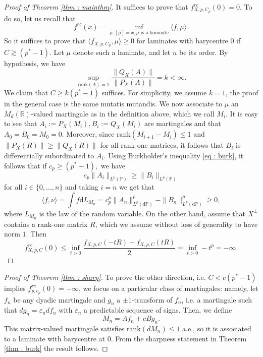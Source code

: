 \documentclass[11pt, a4paper, reqno]{elsarticle}
\theoremstyle{definition}
\theoremstyle{remark}
\begin{document}
\begin{proof}[Proof of Theorem \ref{thm : mainthm}]
It suffices to prove that $f_{X,p,C_p}^{rc}(0)=0$.
To do so, let us recall that
\begin{equation*}
	f^{rc}(x)
=
	\inf_{\mu\colon  [\mu]=x, \mu\text{ is a laminate}}
	\langle f,\mu\rangle.
\end{equation*}
So it suffices to prove that $\langle f_{X,p,C_p},\mu\rangle\ge 0$
for laminates with barycentre $0$ if $C\gtrsim (p^*-1)$.
Let $\mu$ denote such a laminate, and let $n$ be its order.
By hypothesis, we have
\begin{equation*}
	\sup_{\mathrm{rank}(A)=1}
	\frac{\|Q_X(A)\|}{\|P_X(A)\|}
=
	k
<
	\infty.
\end{equation*}
We claim that $C\ge k(p^*-1)$ suffices.
For simplicity, we assume $k=1$,
the proof in the general case is the same mutatis mutandis.
We now associate to $\mu$ an $M_d(\mathbb{R})$-valued martingale
as in the definition above, which we call $M_i$. 
It is easy to see that
$A_i:= P_{X}(M_i),
B_i:= Q_{X}(M_i)$
are martingales and that $A_0=B_0=M_0=0.$
Moreover, since $\mathrm{rank}(M_{i+1}-M_i)\le 1$ and 
$\|P_{X}(R)\|\ge \|Q_{X}(R)\|$
for all rank-one matrices,
it follows that $B_i$ is differentially subordinated to $A_i$.
Using Burkholder's inequality \eqref{eq : burk},
it follows that if $c_p\ge (p^*-1),$ we have
\begin{equation*}
	c_p\|A_i\|_{L^p(\mathbb P)}
\ge
	\|B_i\|_{L^p(\mathbb P)}
\end{equation*}
for all $i\in \{0,\dots, n\}$ and taking $i=n$ we get  that
   \begin{equation*}
	\langle f,\nu\rangle
=
	\int f\mathrm{d} L_{M_n}
=
	c_p^p\|A_n\|^p_{L^p(\mathrm{d} \mathbb P)}
-
	\|B_n\|^p_{L^p(\mathrm{d} \mathbb P)}
\ge
	0,
\end{equation*} 
where $L_{M_n}$ is the law of the random
variable.
On the other hand, assume that $X^\perp$ contains a rank-one matrix $R$, 
which we assume without loss of generality to have norm $1$.
Then
\begin{equation*}
	f_{X,p,C}^{rc}(0)
\le
	\inf_{t>0}
	\frac{f_{X,p,C}(-tR)
+
	f_{X,p,C}(tR)}{2}
=
	\inf_{t>0}-t^p
=
	-\infty.
\end{equation*}
\end{proof}
\begin{proof}[Proof of Theorem \ref{thm : sharp}]
To prove the other direction,
i.e. $C<c(p^*-1)$ implies $f_{p,c_p}^{rc}(0)=-\infty$,
we focus on a particular class of martingales:
namely, let $f_n$ be any dyadic martingale and $g_n$
a $\pm1$-transform of $f_n$,
i.e. a martingale such that $dg_n=\varepsilon_n df_n$ with $
\varepsilon_n$ a predictable sequence of signs.
Then, we define
\begin{equation*}
	M_n
=
	A f_n
+
	cBg_n.
\end{equation*}
This matrix-valued martingale satisfies $\mathrm{rank}(dM_n)\le 1$ a.e.,
so it is associated to a laminate with barycentre at $0$.
From the sharpness statement in Theorem \ref{thm : burk}
the result follows.
\end{proof}
\end{document}
